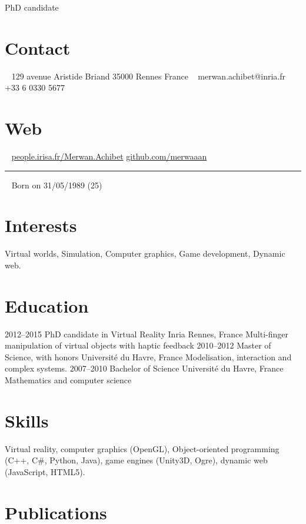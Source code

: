 \documentclass[]{friggeri-cv}
\begin{document}
       {PhD candidate}

\begin{aside}
  \section{Contact}
    ~
    129 avenue Aristide Briand
    35000 Rennes
    France
    ~
    merwan.achibet@inria.fr
    ~
    +33 6 0330 5677
  \section{Web}
    ~
    \href{http://people.irisa.fr/Merwan.Achibet/}{people.irisa.fr/Merwan.Achibet}
    \href{http://github.com/merwaaan}{github.com/merwaaan}
    ~
    {\color{lightergray}\rule{3cm}{0.01cm}}
    ~
    Born on 31/05/1989 (25)
\end{aside}

\section{Interests}

Virtual worlds, Simulation, Computer graphics, Game development, Dynamic web.

\section{Education}

\begin{entrylist}
  \entry
    {2012–2015}
    {PhD candidate in Virtual Reality}
    {Inria Rennes, France}
    {Multi-finger manipulation of virtual objects with haptic feedback}
  \entry
    {2010–2012}
    {Master of Science, with honors}
    {Université du Havre, France}
    {Modelisation, interaction and complex systems.}
  \entry
    {2007–2010}
    {Bachelor of Science}
    {Université du Havre, France}
		{Mathematics and computer science}
\end{entrylist}

\section{Skills}

Virtual reality, computer graphics (OpenGL), Object-oriented programming (C++, C\#, Python, Java), game engines (Unity3D, Ogre), dynamic web (JavaScript, HTML5).

\section{Publications}
\end{document}

